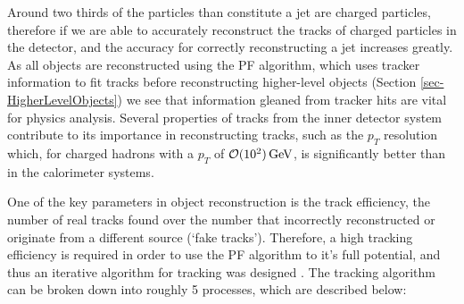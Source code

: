 Around two thirds of the particles than constitute a jet are charged particles, therefore if we are able to accurately reconstruct the tracks of charged particles in the detector, and the accuracy for correctly reconstructing a jet increases greatly. As all objects are reconstructed using the PF algorithm, which uses tracker information to fit tracks before reconstructing higher-level objects (Section \ref{sec-HigherLevelObjects}) we see that information gleaned from tracker hits are vital for physics analysis. Several properties of tracks from the inner detector system contribute to its importance in reconstructing tracks, such as the $p_T$ resolution which, for charged hadrons with a $p_T$ of $\mathcal{O}(10^2) \,\text{Ge\hspace{-.08em}V}$, is significantly better than in the calorimeter systems.

One of the key parameters in object reconstruction is the track efficiency, the number of real tracks found over the number that incorrectly reconstructed or originate from a different source (`fake tracks'). Therefore, a high tracking efficiency is required in order to use the PF algorithm to it's full potential, and thus an iterative algorithm for tracking was designed \cite{1748-0221-9-10-P10009}. The tracking algorithm can be broken down into roughly 5 processes, which are described below:

